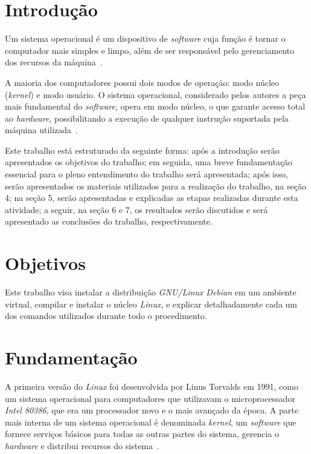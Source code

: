 \documentclass[
	12pt,				%
	oneside,   	        %
	a4paper,			%
	english,			%
	french,				%
	spanish,			%
	brazil,				%
	]{pacotes/abntex2}
\begin{document}
\makeatletter
\renewcommand{\chapter}{\@gobbletwo}
\makeatother

\section{Introdução}
\label{sec:introducao}
Um sistema operacional é um dispositivo de \textit{software} cuja função é tornar o computador mais simples e limpo, além de ser responsável pelo gerenciamento dos recursos da máquina~\cite{tanenbaum2016}.

A maioria dos computadores possui dois modos de operação: modo núcleo (\textit{kernel}) e modo usuário. O sistema operacional, considerado pelos autores a peça mais fundamental do \textit{software}, opera em modo núcleo, o que garante acesso total ao \textit{hardware}, possibilitando a execução de qualquer instrução suportada pela máquina utilizada~\cite{tanenbaum2016}.

Este trabalho está estruturado da seguinte forma: após a introdução serão apresentados os objetivos do trabalho; em seguida, uma breve fundamentação essencial para o pleno entendimento do trabalho será apresentada; após isso, serão apresentados os materiais utilizados para a realização do trabalho, na seção 4; na seção 5, serão apresentadas e explicadas as etapas realizadas durante esta atividade; a seguir, na seção 6 e 7, os resultados serão discutidos e será apresentado as conclusões do trabalho, respectivamente.



\section{Objetivos}
\label{sec:objetivos}

Este trabalho visa instalar a distribuição \textit{GNU/Linux Debian} em um ambiente virtual, compilar e instalar o núcleo \textit{Linux}, e explicar detalhadamente cada um dos comandos utilizados durante todo o procedimento.

\section{Fundamentação}
\label{sec:fundamentacao}

A primeira versão do \textit{Linux} foi desenvolvida por Linus Torvalds em 1991, como um sistema operacional para computadores que utilizavam o microprocessador \textit{Intel 80386}, que era um processador novo e o mais avançado da época. A parte mais interna de um sistema operacional é denominada \textit{kernel}, um \textit{software} que fornece serviços básicos para todas as outras partes do sistema, gerencia o \textit{hardware} e distribui recursos do sistema~\cite{robert2010}.
\end{document}

